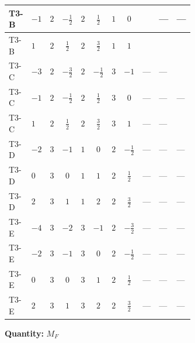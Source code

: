 \documentclass[8pt]{article}
\begin{document}
\begin{landscape}
\begin{longtable}{@{}llcccccc >{\raggedright\arraybackslash}p{0.21\linewidth} >{\raggedright\arraybackslash}p{0.21\linewidth} >{\raggedright\arraybackslash}p{0.21\linewidth}@{}}
\midrule
T3-B & $-1$ & $2$ & $-\frac{1}{2}$ & $2$ & $\frac{1}{2}$ & $1$ & $0$ & \scriptsize\adjustbox{max width=\linewidth}{$\begin{gathered} +\left(\left({y_1}\right)^{T}\,\left({y_1}\right)^{*}\,{M_F}\right)_{ij}\end{gathered}$} & --- & --- \\
\midrule
T3-B & $1$ & $2$ & $\frac{1}{2}$ & $2$ & $\frac{3}{2}$ & $1$ & $1$ & \scriptsize\adjustbox{max width=\linewidth}{$\begin{gathered} \left(\left({y_1}\right)^{T}\,\left({y_1}\right)^{*}\,{M_F}\right)_{ij}\end{gathered}$} & \scriptsize\adjustbox{max width=\linewidth}{$\begin{gathered} +\left({M_F}\,\left({y_2}\right)^{\dagger}\,{y_2}\right)_{ij}\end{gathered}$} & \scriptsize\adjustbox{max width=\linewidth}{$\begin{gathered} -6 {g_1}^2 \left({M_F}\right)_{ij}\end{gathered}$} \\
\midrule
T3-C & $-3$ & $2$ & $-\frac{3}{2}$ & $2$ & $-\frac{1}{2}$ & $3$ & $-1$ & --- & --- & \scriptsize\adjustbox{max width=\linewidth}{$\begin{gathered} -6 {g_1}^2 \left({M_F}\right)_{ij}\end{gathered}$} \\
\midrule
T3-C & $-1$ & $2$ & $-\frac{1}{2}$ & $2$ & $\frac{1}{2}$ & $3$ & $0$ & --- & --- & --- \\
\midrule
T3-C & $1$ & $2$ & $\frac{1}{2}$ & $2$ & $\frac{3}{2}$ & $3$ & $1$ & --- & --- & \scriptsize\adjustbox{max width=\linewidth}{$\begin{gathered} -6 {g_1}^2 \left({M_F}\right)_{ij}\end{gathered}$} \\
\midrule
T3-D & $-2$ & $3$ & $-1$ & $1$ & $0$ & $2$ & $-\frac{1}{2}$ & --- & --- & --- \\
\midrule
T3-D & $0$ & $3$ & $0$ & $1$ & $1$ & $2$ & $\frac{1}{2}$ & --- & --- & --- \\
\midrule
T3-D & $2$ & $3$ & $1$ & $1$ & $2$ & $2$ & $\frac{3}{2}$ & --- & --- & --- \\
\midrule
T3-E & $-4$ & $3$ & $-2$ & $3$ & $-1$ & $2$ & $-\frac{3}{2}$ & --- & --- & --- \\
\midrule
T3-E & $-2$ & $3$ & $-1$ & $3$ & $0$ & $2$ & $-\frac{1}{2}$ & --- & --- & --- \\
\midrule
T3-E & $0$ & $3$ & $0$ & $3$ & $1$ & $2$ & $\frac{1}{2}$ & --- & --- & --- \\
\midrule
T3-E & $2$ & $3$ & $1$ & $3$ & $2$ & $2$ & $\frac{3}{2}$ & --- & --- & --- \\
\midrule
\bottomrule
\end{longtable}
\clearpage
\noindent\textbf{Quantity: }$M_F$\par\smallskip

\end{landscape}
\end{document}
